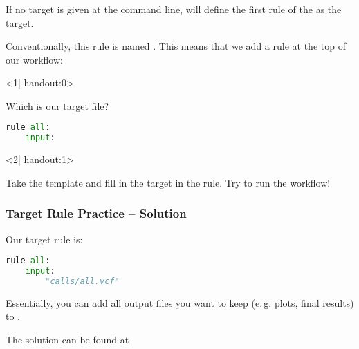 \begin{frame}[fragile]
	\frametitle{}
	\begin{docs}
		If no target is given at the command line, \Snakemake{} will define the first rule of the  as the target.
	\end{docs}
	Conventionally, this rule is named . This means that we add a rule at the top of our workflow:\newline
	\begin{onlyenv}<1| handout:0>
		\begin{question}
			Which is our target file?
		\end{question}
		\begin{lstlisting}[language=Python,style=Python]
rule all:
	input: 
		\end{lstlisting}
	\end{onlyenv}
	\begin{onlyenv}<2| handout:1>
	   \begin{task}
	   	  Take the template  and fill in the target in the  rule. Try to run the workflow!
	   \end{task}
	\end{onlyenv}
\end{frame}

\begin{frame}[fragile]
	\frametitle{Target Rule Practice -- Solution}
	Our target rule is:
	\begin{lstlisting}[language=Python,style=Python]
rule all:
    input: 
        "calls/all.vcf"
	\end{lstlisting}
    \pause
    \begin{hint}
       Essentially, you can add all output files you want to keep (e.\,g. plots, final results) to .
    \end{hint}
    The solution can be found at 
\end{frame}
